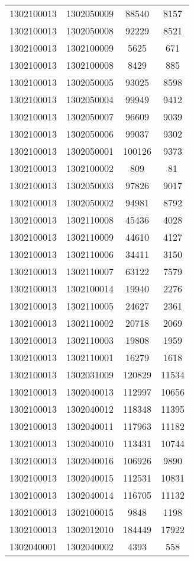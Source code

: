 \begin{longtable}[h]{llcc}
		1302100013 & 1302050009 & 88540 & 8157\\
		1302100013 & 1302050008 & 92229 & 8521\\
		1302100013 & 1302100009 & 5625 & 671\\
		1302100013 & 1302100008 & 8429 & 885\\
		1302100013 & 1302050005 & 93025 & 8598\\
		1302100013 & 1302050004 & 99949 & 9412\\
		1302100013 & 1302050007 & 96609 & 9039\\
		1302100013 & 1302050006 & 99037 & 9302\\
		1302100013 & 1302050001 & 100126 & 9373\\
		1302100013 & 1302100002 & 809 & 81\\
		1302100013 & 1302050003 & 97826 & 9017\\
		1302100013 & 1302050002 & 94981 & 8792\\
		1302100013 & 1302110008 & 45436 & 4028\\
		1302100013 & 1302110009 & 44610 & 4127\\
		1302100013 & 1302110006 & 34411 & 3150\\
		1302100013 & 1302110007 & 63122 & 7579\\
		1302100013 & 1302100014 & 19940 & 2276\\
		1302100013 & 1302110005 & 24627 & 2361\\
		1302100013 & 1302110002 & 20718 & 2069\\
		1302100013 & 1302110003 & 19808 & 1959\\
		1302100013 & 1302110001 & 16279 & 1618\\
		1302100013 & 1302031009 & 120829 & 11534\\
		1302100013 & 1302040013 & 112997 & 10656\\
		1302100013 & 1302040012 & 118348 & 11395\\
		1302100013 & 1302040011 & 117963 & 11182\\
		1302100013 & 1302040010 & 113431 & 10744\\
		1302100013 & 1302040016 & 106926 & 9890\\
		1302100013 & 1302040015 & 112531 & 10831\\
		1302100013 & 1302040014 & 116705 & 11132\\
		1302100013 & 1302100015 & 9848 & 1198\\
		1302100013 & 1302012010 & 184449 & 17922\\
		1302040001 & 1302040002 & 4393 & 558\\

\end{longtable}
